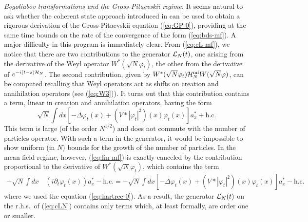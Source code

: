 \documentclass[11pt,a4paper]{article}
\newcommand{\cH}{{\cal H}}
\newcommand{\cL}{{\cal L}}
\begin{document}
{\it Bogoliubov transformations and the Gross-Pitaevskii regime.} It seems natural to ask whether the coherent state approach introduced in \cite{RS} can be used to obtain a rigorous derivation of the Gross-Pitaevskii equation (\ref{eq:GP-0}), providing at the same time bounds on the rate of the convergence of the form (\ref{eq:bds-mf}). A major difficulty in this program is immediately clear. 
{F}rom (\ref{eq:cL-mf}), we notice that there are two contributions to the generator $\cL_N (t)$, one 
 arising from the derivative of the Weyl operator $W^* (\sqrt{N}
 \varphi_t)$, the other from the derivative of $e^{-i (t-s) \cH_N}$. The
 second contribution, given by $W^* (\sqrt{N} \varphi_t) \cH^{\text{mf}}_N
 W(\sqrt{N} \varphi)$, can be computed recalling that Weyl operators act as shifts on creation and annihilation operators (see (\ref{eq:W3})). It turns out that this contribution contains a term, linear in creation and annihilation operators, having the form
\begin{equation}\label{eq:lin-mf}  \sqrt{N} \int dx \left[ -\Delta \varphi_t (x) + (V*|\varphi_t|^2) (x) \varphi_t (x) \right] a_x^* + \text{h.c.} \end{equation}
This term is large (of the order $N^{1/2}$) and does not commute with the number of particles operator. With such a term in the generator, it would be impossible to show uniform (in $N$) bounds for the growth of the number of particles. In the mean field regime, however, (\ref{eq:lin-mf}) is exactly 
canceled by the contribution proportional to the derivative of $W^* (\sqrt{N} \varphi_t)$, which contains the term
\[ \begin{split} -\sqrt{N} \int dx \, & ( i \partial_t \varphi_t (x) ) a_x^* - \text{h.c.} = -
\sqrt{N} \int dx \left[ -\Delta \varphi_t (x) + (V*|\varphi_t|^2) (x) \varphi_t (x) \right] a_x^* - \text{h.c.} 
\end{split}
\]
where we used the equation (\ref{eq:hartree-0}). As a result, the generator $\cL_N (t)$ on the r.h.s.\ of (\ref{eq:cLN}) contains only terms which, at least formally, are order one or smaller. 
\end{document}
